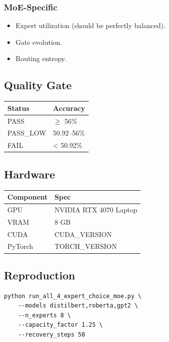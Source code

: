 \subsubsection{MoE-Specific}
\begin{itemize}
\item Expert utilization (should be perfectly balanced).
\item Gate evolution.
\item Routing entropy.

\end{itemize}
\subsection{Quality Gate}

\begin{table}[H]
\centering
\small
\begin{tabular}{ll}
\toprule
\textbf{Status} & \textbf{Accuracy} \\
\midrule
PASS & $\ge$ 56\% \\
PASS\_LOW & 50.92--56\% \\
FAIL & < 50.92\% \\
\bottomrule
\end{tabular}
\end{table}

\subsection{Hardware}

\begin{table}[H]
\centering
\small
\begin{tabular}{ll}
\toprule
\textbf{Component} & \textbf{Spec} \\
\midrule
GPU & NVIDIA RTX 4070 Laptop \\
VRAM & 8 GB \\
CUDA & {{CUDA\_VERSION}} \\
PyTorch & {{TORCH\_VERSION}} \\
\bottomrule
\end{tabular}
\end{table}

\subsection{Reproduction}

\begin{lstlisting}
python run_all_4_expert_choice_moe.py \
    --models distilbert,roberta,gpt2 \
    --n_experts 8 \
    --capacity_factor 1.25 \
    --recovery_steps 50
\end{lstlisting}

